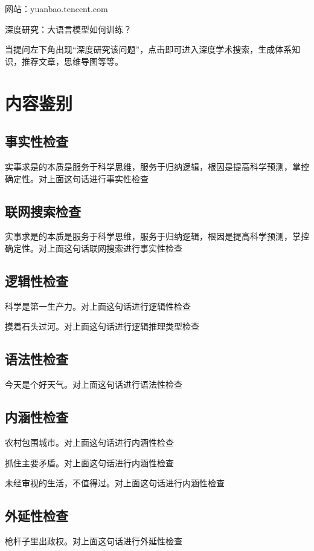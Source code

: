 \documentclass[12pt]{book}
\begin{document}
网站：yuanbao.tencent.com


深度研究：大语言模型如何训练？


当提问左下角出现“深度研究该问题”，点击即可进入深度学术搜索，生成体系知识，推荐文章，思维导图等等。

\chapter{内容鉴别}
\section{事实性检查}
实事求是的本质是服务于科学思维，服务于归纳逻辑，根因是提高科学预测，掌控确定性。对上面这句话进行事实性检查

\section{联网搜索检查}
实事求是的本质是服务于科学思维，服务于归纳逻辑，根因是提高科学预测，掌控确定性。对上面这句话联网搜索进行事实性检查

\section{逻辑性检查}

科学是第一生产力。对上面这句话进行逻辑性检查


摸着石头过河。对上面这句话进行逻辑推理类型检查

\section{语法性检查}

今天是个好天气。对上面这句话进行语法性检查


\section{内涵性检查}

农村包围城市。对上面这句话进行内涵性检查

抓住主要矛盾。对上面这句话进行内涵性检查

未经审视的生活，不值得过。对上面这句话进行内涵性检查

\section{外延性检查}

枪杆子里出政权。对上面这句话进行外延性检查
\end{document}
